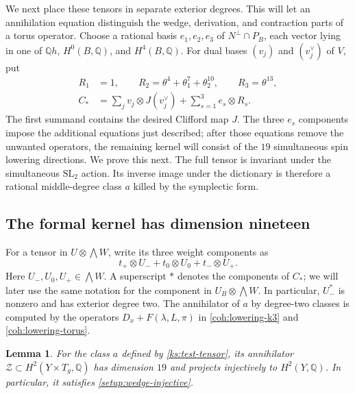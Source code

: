 \documentclass[11pt]{article}
\numberwithin{equation}{section}
\newtheorem{lemma}[theorem]{Lemma}
\theoremstyle{definition}
\theoremstyle{remark}
\newcommand{\Q}{\mathbb Q}
\begin{document}
We next place these tensors in separate exterior degrees.  This will
let an annihilation equation distinguish the wedge, derivation, and
contraction parts of a torus operator.  Choose a rational basis
$e_1,e_2,e_3$ of $N^\perp\cap P_B$,
each vector lying in one of $\Q h$, $H^0(B,\Q)$, and
$H^4(B,\Q)$.  For dual bases $(v_j)$ and $(v_j^\vee)$ of
$V$, put
\begin{equation}
 \label{ks:test-tensor}
 \begin{split}
 R_1&=1,\qquad
 R_2=\theta^4+\theta_1^7+\theta_2^{10},\qquad
 R_3=\theta^{13},\\
 C_*&=\sum_jv_j\otimes J(v_j^\vee)
            +\sum_{s=1}^3e_s\otimes R_s.
 \end{split}
\end{equation}
The first summand contains the desired Clifford map $J$.
The three $e_s$ components impose the additional equations just
described; after those equations remove the unwanted operators,
the remaining kernel will consist of the $19$ simultaneous spin
lowering directions.  We prove this next.
The full tensor is invariant under the simultaneous $\mathrm{SL}_2$
action.  Its inverse image under the dictionary is therefore
a rational middle-degree class $a$ killed by the symplectic
form.

\subsection{The formal kernel has dimension nineteen}
\label{ks:formal-kernel-section}

For a tensor in $U\otimes\bigwedge W$, write its three weight
components as
\begin{equation}
 \label{ks:weight-components}
 t_+\otimes U_-+t_0\otimes U_0+t_-\otimes U_+.
\end{equation}
Here $U_-,U_0,U_+\in\bigwedge W$.  A superscript $*$ denotes
the components of $C_*$; we will later use the same notation for
the component in $U_B\otimes\bigwedge W$.
In particular, $U_-^*$ is nonzero and has exterior degree two.
The annihilator of $a$ by degree-two classes is computed by
the operators $D_x+F(\lambda,L,\pi)$ in
\eqref{coh:lowering-k3} and \eqref{coh:lowering-torus}.

\begin{lemma}
 \label{ks:formal-kernel}
For the class $a$ defined by \eqref{ks:test-tensor}, its
annihilator $\mathcal Z\subset H^2(Y\times T_g,\Q)$ has
dimension $19$ and projects injectively to $H^2(Y,\Q)$.
In particular, it satisfies \eqref{setup:wedge-injective}.
\end{lemma}
\end{document}
